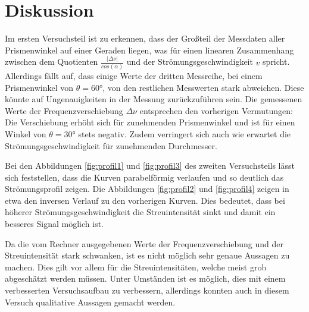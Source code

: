 \section{Diskussion}

Im ersten Versuchsteil ist zu erkennen, dass der Großteil der Messdaten aller Prismenwinkel auf einer Geraden liegen, was für einen linearen Zusammenhang zwischen dem Quotienten $\frac{\lvert \Delta \nu \rvert}{cos(\alpha)}$ und der Strömungsgeschwindigkeit 
$v$ spricht. Allerdings fällt auf, dass einige Werte der dritten Messreihe, bei einem Prismenwinkel von $\theta = 60°$, von den restlichen Messwerten stark abweichen. Diese könnte auf Ungenauigkeiten in der Messung zurückzuführen sein.
Die gemessenen Werte der Frequenzverschiebung $\Delta \nu$ entsprechen den vorherigen Vermutungen: Die Verschiebung erhöht sich für zunehmenden Prismenwinkel und ist für einen Winkel von $\theta = 30°$ stets negativ. Zudem verringert sich auch wie erwartet die
Strömungsgeschwindigkeit für zunehmenden Durchmesser.

Bei den Abbildungen \ref{fig:profil1} und \ref{fig:profil3} des zweiten Versuchsteils lässt sich feststellen, dass die Kurven parabelförmig verlaufen und so deutlich das Strömungsprofil zeigen. 
Die Abbildungen \ref{fig:profil2} und \ref{fig:profil4} zeigen in etwa den inversen Verlauf zu den vorherigen Kurven. Dies bedeutet, dass bei höherer Strömungsgeschwindigkeit die Streuintensität sinkt und damit ein besseres Signal möglich ist. 

Da die vom Rechner ausgegebenen Werte der Frequenzverschiebung und der Streuintensität stark schwanken, ist es nicht möglich sehr genaue Aussagen zu machen. Dies gilt vor allem für die Streuintensitäten, welche meist grob abgeschätzt werden müssen. Unter 
Umständen ist es möglich, dies mit einem verbesserten Versuchsaufbau zu verbessern, allerdings konnten auch in diesem Versuch qualitative Aussagen gemacht werden.
